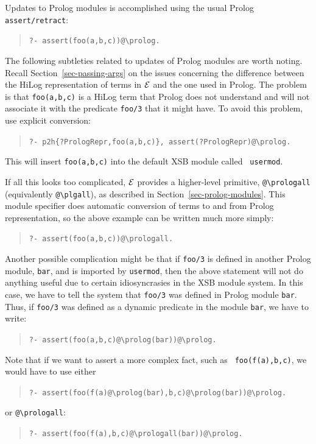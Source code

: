 \documentclass[11pt]{article}
\newcommand{\ERGO}{\mbox{\ensuremath{\cal{E}}\smaller{{\sc{RGO}}}}\xspace}
\newcommand{\FLSYSTEM}{\ERGO}
\newcommand{\bs}{\textbackslash}
\begin{document}
Updates to Prolog modules is accomplished using the usual
Prolog {\tt assert/retract}:
\begin{quote}
 {\tt ?- assert(foo(a,b,c))@\bs{}prolog.  }
\end{quote}
The following subtleties related to updates of Prolog modules are worth
noting. Recall Section~\ref{sec-passing-args} on the issues concerning the
difference between the HiLog representation of terms in \FLSYSTEM and the one
used in Prolog. The problem is that {\tt foo(a,b,c)} is a HiLog term that
Prolog does not understand and will not associate it with the predicate
{\tt foo/3} that it might have. To avoid this problem, use explicit conversion:
\begin{quote}
 {\tt ?- p2h\{?PrologRepr,foo(a,b,c)\}, assert(?PrologRepr)@\bs{}prolog.  }
\end{quote}
This will insert {\tt foo(a,b,c)} into the default XSB module called {\tt
  usermod}.

\index{"@\bs{}prologall}
\index{"@\bs{}plgall}
If all this looks too complicated, \FLSYSTEM provides a higher-level
primitive, {\tt @\bs{}prologall} (equivalently {\tt @\bs{}plgall}), as described in
Section~\ref{sec-prolog-modules}. This module specifier does automatic
conversion of terms to and from Prolog representation, so the above example
can be written much more simply:
\begin{quote}
 {\tt ?- assert(foo(a,b,c))@\bs{}prologall.  }  
\end{quote}

Another possible complication might be that
if {\tt foo/3} is defined in another Prolog module, {\tt bar}, and
is imported by {\tt usermod}, then the above statement will not do anything
useful due to certain idiosyncrasies in the XSB module system. In this
case, we have to tell the system that {\tt foo/3} was defined in Prolog
module {\tt bar}.  Thus, if
{\tt foo/3} was defined as a dynamic predicate in the module
  {\tt bar}, we have to write:
\begin{quote}
 {\tt ?- assert(foo(a,b,c)@\bs{}prolog(bar))@\bs{}prolog.  }  
\end{quote}
Note that if we want to assert a more complex fact, such as {\tt
  foo(f(a),b,c)}, we would have to use either
\begin{quote}
 {\tt ?- assert(foo(f(a)@\bs{}prolog(bar),b,c)@\bs{}prolog(bar))@\bs{}prolog.}  
\end{quote}
or {\tt @\bs{}prologall}:
\begin{quote}
 {\tt ?- assert(foo(f(a),b,c)@\bs{}prologall(bar))@\bs{}prolog.}  
\end{quote}
\end{document}
